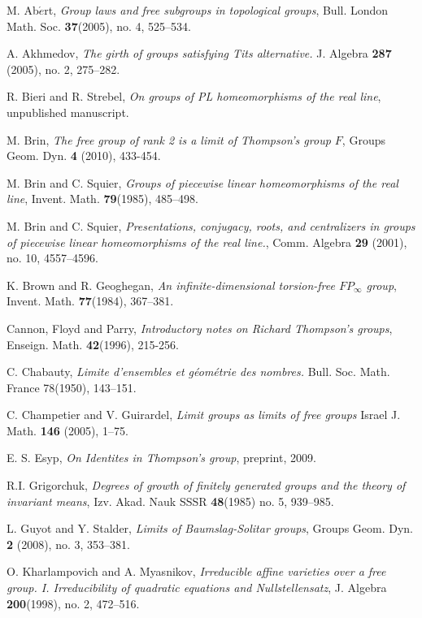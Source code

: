 \documentclass[11pt]{amsart}
\begin{document}
\begin{thebibliography}{CCC}

 M. Ab$\acute{e}$rt, {\em Group laws and free subgroups in topological groups}, Bull. London Math. Soc. \textbf{37}(2005), no. 4, 525--534.
    
 A. Akhmedov, {\em The girth of groups satisfying Tits alternative.}  J. Algebra  \textbf{287}  (2005),  no. 2, 275--282.

 R. Bieri and R. Strebel, {\em On groups of PL
homeomorphisms of the real line}, unpublished manuscript.

 M. Brin, {\em The free group of rank 2 is a limit of Thompson's group $F$}, Groups Geom. Dyn. \textbf{4} (2010), 433-454.

 M. Brin and C. Squier, {\em Groups of piecewise
linear homeomorphisms of the real line}, Invent. Math.
\textbf{79}(1985), 485--498.

 M. Brin and C. Squier, {\em Presentations, conjugacy, roots, and centralizers in groups of piecewise linear homeomorphisms of the real line.}, Comm. Algebra \textbf{29} (2001), no. 10, 4557--4596.

 K. Brown and R. Geoghegan, {\em An infinite-dimensional torsion-free $FP_{\infty}$ group}, Invent. Math. \textbf{77}(1984), 367--381.

 Cannon, Floyd and Parry, {\em Introductory
notes on Richard Thompson's groups}, Enseign. Math.
\textbf{42}(1996), 215-256.

C. Chabauty, {\em Limite d'ensembles et géométrie des nombres.} Bull. Soc. Math. France 78(1950), 143--151.

 C. Champetier and V. Guirardel, {\em Limit groups as limits of free groups} Israel J. Math. \textbf{146} (2005),
1--75.

 E. S. Esyp, {\em On Identites in Thompson's group}, preprint, 2009.

R.I. Grigorchuk, {\em Degrees of growth of finitely generated groups and the theory of invariant means}, Izv. Akad. Nauk SSSR \textbf{48}(1985) no. 5, 939--985.

 L. Guyot and Y. Stalder, {\em Limits of Baumslag-Solitar
groups}, Groups Geom. Dyn. \textbf{2} (2008), no. 3, 353--381.

O. Kharlampovich and A. Myasnikov, {\em Irreducible affine varieties over a free group. I. Irreducibility of quadratic equations and Nullstellensatz}, J. Algebra \textbf{200}(1998), no. 2, 472--516.


\end{thebibliography}
\end{document}
